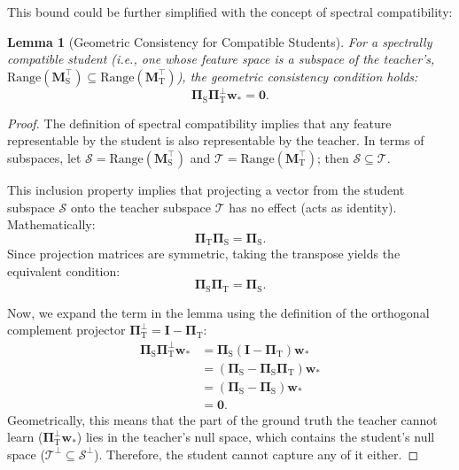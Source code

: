 \documentclass{article}
\theoremstyle{definition}
\theoremstyle{definition}
\theoremstyle{plain}
\theoremstyle{plain}
\theoremstyle{plain}
\newtheorem{lemma}{Lemma}
\theoremstyle{plain}
\theoremstyle{plain}
\newcommand{\bs}[1]{\boldsymbol{\mathbf{#1}}}
\newcommand{\te}{\mathrm{T}}
\newcommand{\st}{\mathrm{S}}
\newcommand{\M}{\mathbf{M}}
\newcommand{\w}{\mathbf{w}}
\newcommand{\id}{\mathbf{I}}
\begin{document}
This bound could be further simplified with the concept of spectral compatibility:

\begin{lemma}[Geometric Consistency for Compatible Students]
\label{lem:spectral_compatibility}
    For a spectrally compatible student (i.e., one whose feature space is a subspace of the teacher's, $\text{Range}(\M_\st^\top) \subseteq \text{Range}(\M_\te^\top)$), the geometric consistency condition holds:
    \begin{equation}
        \bs \Pi_{\st}\bs \Pi_{\te}^{\perp}\w_{*} = \bs 0.
    \end{equation}
\end{lemma}

\begin{proof}
    The definition of spectral compatibility implies that any feature representable by the student is also representable by the teacher. In terms of subspaces, let $\mathcal{S} = \text{Range}(\M_\st^\top)$ and $\mathcal{T} = \text{Range}(\M_\te^\top)$; then $\mathcal{S} \subseteq \mathcal{T}$.

    This inclusion property implies that projecting a vector from the student subspace $\mathcal{S}$ onto the teacher subspace $\mathcal{T}$ has no effect (acts as identity). Mathematically:
    \begin{equation}
        \bs \Pi_\te \bs \Pi_\st = \bs \Pi_\st.
    \end{equation}
    Since projection matrices are symmetric, taking the transpose yields the equivalent condition:
    \begin{equation}
        \bs \Pi_\st \bs \Pi_\te = \bs \Pi_\st.
    \end{equation}
    
    Now, we expand the term in the lemma using the definition of the orthogonal complement projector $\bs \Pi_\te^\perp = \id - \bs \Pi_\te$:
    \begin{equation}
    \begin{aligned}
        \bs \Pi_{\st}\bs \Pi_{\te}^{\perp}\w_{*} &= \bs \Pi_{\st}(\id - \bs \Pi_{\te})\w_{*} \\
        &= (\bs \Pi_{\st} - \bs \Pi_{\st}\bs \Pi_{\te})\w_{*} \\
        &= (\bs \Pi_{\st} - \bs \Pi_{\st})\w_{*} \\
        &= \bs 0.
    \end{aligned}
    \end{equation}
    Geometrically, this means that the part of the ground truth the teacher cannot learn ($\bs \Pi_{\te}^{\perp}\w_{*}$) lies in the teacher's null space, which contains the student's null space ($\mathcal{T}^\perp \subseteq \mathcal{S}^\perp$). Therefore, the student cannot capture any of it either.
\end{proof}
\end{document}
